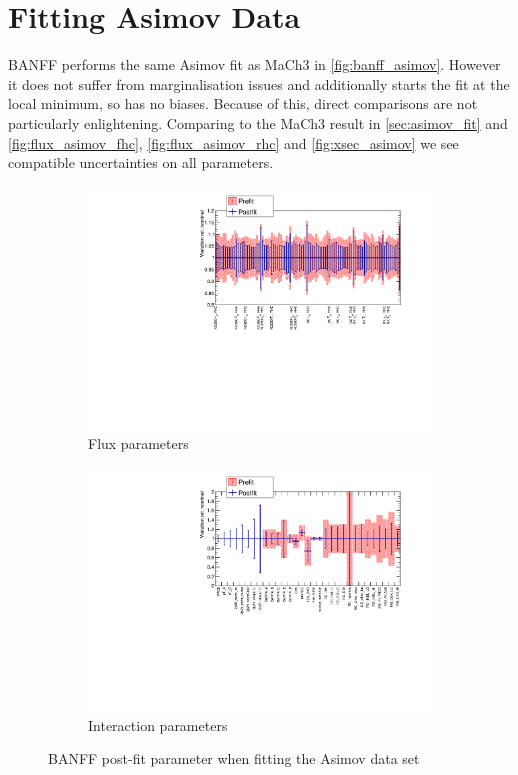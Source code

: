 \section{Fitting Asimov Data}
BANFF performs the same Asimov fit as MaCh3 in \autoref{fig:banff_asimov}. However it does not suffer from marginalisation issues and additionally starts the fit at the local minimum, so has no biases. Because of this, direct comparisons are not particularly enlightening. Comparing to the MaCh3 result in \autoref{sec:asimov_fit} and \autoref{fig:flux_asimov_fhc}, \autoref{fig:flux_asimov_rhc} and \autoref{fig:xsec_asimov} we see compatible uncertainties on all parameters.
\begin{figure}[h]
	\begin{subfigure}[t]{0.49\textwidth}
		\includegraphics[width=\textwidth, trim={10mm 17mm 15mm 0mm}, clip, page=1]{figures/mach3/banff/asimov_banff_flux}
		\caption{Flux parameters}
	\end{subfigure}
	\begin{subfigure}[t]{0.49\textwidth}
		\includegraphics[width=\textwidth, trim={10mm 15mm 15mm 0mm}, clip, page=1]{figures/mach3/banff/asimov_banff_xsec}
		\caption{Interaction parameters}
	\end{subfigure}
	\caption{BANFF post-fit parameter when fitting the Asimov data set}
	\label{fig:banff_asimov}
\end{figure}

